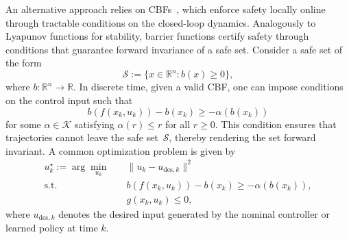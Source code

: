 An alternative approach relies on \acp{CBF}~\cite{ames2019control}, which enforce safety locally online through tractable conditions on the closed-loop dynamics. Analogously to Lyapunov functions for stability, barrier functions certify safety through conditions that guarantee forward invariance of a safe set. Consider a safe set of the form
\[
	\mathcal S := \{x \in \mathbb R^n : b(x)\ge0\},
\]
where $b : \mathbb R^n \to \mathbb R$. In discrete time, given a valid \ac{CBF}, one can  impose conditions on the control input such that
\[
	b(f(x_k,u_k)) - b(x_k)
	\ge
	-\alpha(b(x_k))
\]
for some $\alpha \in \mathcal K$ satisfying $\alpha(r) \le r$ for all $r \ge 0$. This condition ensures that trajectories cannot leave the safe set~$\mathcal S$, thereby rendering the set forward invariant.  %
A common optimization problem is given by
\[
	\begin{aligned}
		u_k^\star
		:=
		\arg\min_{u_k}
		\quad              &
		\|u_k-u_{\mathrm{des},k}\|^2 \\
		\mathrm{s.t.}\quad &
		b(f(x_k,u_k)) - b(x_k)
		\ge
		-\alpha(b(x_k)),             \\
		                   &
		g(x_k,u_k)\leq 0 ,
	\end{aligned}
\]
where $u_{\mathrm{des},k}$ denotes the desired input generated by the nominal controller or learned policy at time $k$.



